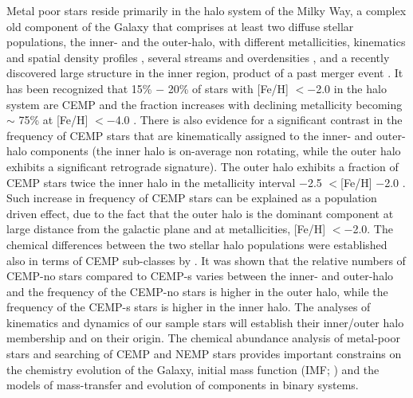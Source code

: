 Metal poor stars reside primarily in the halo system of the Milky Way, a complex old component of the Galaxy that comprises at least two diffuse stellar populations, the inner- and the outer-halo, with different metallicities, kinematics and spatial density profiles \citep{2007Natur.450.1020C, 2010ApJ...712..692C, 2012AAS...21922206B}, several streams and overdensities \citep{2009ApJ...693.1118G}, and a recently discovered large structure in the inner region, product of a past merger event \citep{2018Natur.563...85H}. It has been recognized that 15\% $-$ 20\% of stars with [Fe/H] $< -$2.0 in the halo system are CEMP and the fraction increases with declining metallicity becoming $\sim$ 75\% at [Fe/H] $< -$4.0  \citep[see][and reference therein]{2014ApJ...788..180C}. There is also evidence for a significant contrast in the frequency of CEMP stars that are kinematically assigned to the inner- and outer-halo components (the inner halo is on-average non rotating, while the outer halo exhibits a significant retrograde signature). The outer halo exhibits a fraction of CEMP stars twice the inner halo in the metallicity interval $-$2.5 $<$[Fe/H] $-$2.0 \citep{2012ApJ...744..195C}. Such increase in frequency of CEMP stars can be explained as a population driven effect, due to the fact that the outer halo is the dominant component at large distance from the galactic plane and at metallicities, [Fe/H] $< -$2.0. The chemical differences between the two stellar halo populations were established also in terms of CEMP sub-classes by \citet{2014ApJ...788..180C}. It was shown that the relative numbers of CEMP-no stars compared to CEMP-s varies between the inner- and outer-halo and the frequency of the CEMP-no stars is higher in the outer halo, while the frequency of the CEMP-s stars is higher in the inner halo. The analyses of kinematics and dynamics of our sample stars will establish their inner/outer halo membership and on their origin. The chemical abundance analysis of metal-poor stars and searching of CEMP and NEMP stars provides important constrains on the chemistry evolution of the Galaxy, initial mass function (IMF; \citealt{2014ApJ...781...60H}) and the models of mass-transfer and evolution of components in binary systems.